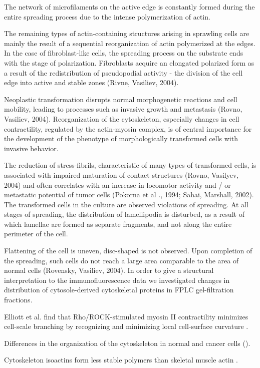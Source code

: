\documentclass[alpha-refs]{wiley-article}
\begin{document}
The network of microfilaments on the active edge is constantly formed during the entire spreading process due to the intense polymerization of actin.

The remaining types of actin-containing structures arising in sprawling cells are mainly the result of a sequential reorganization of actin polymerized at the edges.
In the case of fibroblast-like cells, the spreading process on the substrate ends with the stage of polarization. Fibroblasts acquire an elongated polarized form as a result of the redistribution of pseudopodial activity - the division of the cell edge into active and stable zones (Rivne, Vasiliev, 2004).

Neoplastic transformation disrupts normal morphogenetic reactions and cell mobility, leading to processes such as invasive growth and metastasis (Rovno, Vasiliev, 2004).
Reorganization of the cytoskeleton, especially changes in cell contractility, regulated by the actin-myosin complex, is of central importance for the development of the phenotype of morphologically transformed cells with invasive behavior.

The reduction of stress-fibrils, characteristic of many types of transformed cells, is associated with impaired maturation of contact structures (Rovno, Vasilyev, 2004) and often correlates with an increase in locomotor activity and / or metastatic potential of tumor cells (Pokorna et al ., 1994; Sahai, Marshall, 2002).
The transformed cells in the culture are observed violations of spreading.
At all stages of spreading, the distribution of lamellipodia is disturbed, as a result of which lamellae are formed as separate fragments, and not along the entire perimeter of the cell.

Flattening of the cell is uneven, disc-shaped is not observed.
Upon completion of the spreading, such cells do not reach a large area comparable to the area of normal cells (Rovensky, Vasiliev, 2004).
In order to give a structural interpretation to the immunofluorescence data we investigated changes in distribution of cytosole-derived cytoskeletal proteins in FPLC gel-filtration fractions.

Elliott et al. find that Rho/ROCK-stimulated myosin II contractility minimizes cell-scale branching by recognizing and minimizing local cell-surface curvature \cite{elliott2015myosin}.

Differences in the organization of the cytoskeleton in normal and cancer cells (\cite{shutova2010normal}).

Cytoskeleton isoactins form less stable polymers than skeletal muscle actin \cite{khaitlina2001functional}.
\end{document}
